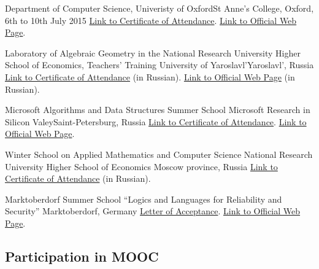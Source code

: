 \documentclass[11pt,a4paper]{moderncv}   %
\newcommand{\myhref}[2]{\textcolor{blue}{\href{#1}{#2}}}
\begin{document}
%
    {Department of Computer Science, Univeristy of Oxford}{St Anne's College, Oxford, 6th to 10th July 2015}%
    {}%
    {\myhref{http://staff.mmcs.sfedu.ru/~ulysses/Papers/Trainings/2015-oxford.pdf}{Link to Certificate of Attendance}. \myhref{https://www.cs.ox.ac.uk/projects/utgp/school/}{Link to Official Web Page}.}

%
    {Laboratory of Algebraic Geometry in the National Research University Higher School of Economics, Teachers' Training University of Yaroslavl'}{Yaroslavl', Russia}%
    {}%
    {\myhref{http://mmcs.sfedu.ru/~ulysses/Papers/Trainings/2011-Yaroslavl.jpg}{Link to Certificate of Attendance} (in Russian). \myhref{http://bogomolov-lab.ru/SHKOLA/}{Link to Official Web Page} (in Russian).}

%
    {Microsoft Algorithms and Data Structures Summer School}%
    {Microsoft Research in Silicon Valey}{Saint-Petersburg, Russia}{}%
    {\myhref{http://mmcs.sfedu.ru/~ulysses/Papers/Trainings/2010-MIDAS-participation.jpg}{Link to Certificate of Attendance}. \myhref{http://logic.pdmi.ras.ru/midas/en/about}{Link to Official Web Page}.}

%
    {Winter School on Applied Mathematics and Computer Science}%
    {National Research University Higher School of Economics}%
    {Moscow province, Russia}{}%
    {\myhref{http://mmcs.sfedu.ru/~ulysses/Papers/Trainings/2010-HSE-math-school-participation.jpg}{Link to Certificate of Attendance} (in Russian).}

%
    {Marktoberdorf Summer School “Logics and Languages for Reliability and Security”}%
    {}{Marktoberdorf, Germany}{}%
    {\myhref{http://mmcs.sfedu.ru/~ulysses/Papers/Trainings/2009-Marktoberdorf-adoption.jpg}{Letter of Acceptance}. \myhref{http://asimod.in.tum.de/2009/index.shtml}{Link to Official Web Page}.}


\subsection{Participation in MOOC}
\end{document}
